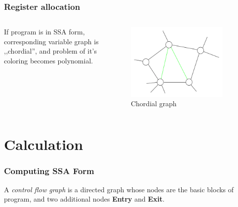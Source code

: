 \documentclass{beamer}
\begin{document}
  \begin{frame}
    \frametitle{Register allocation}
    \begin{columns}
       	\begin{column}{0.5\textwidth}
       		If program is in SSA form, corresponding variable graph is ,,chordial'', and problem of it's coloring becomes polynomial.
    	\end{column}
       	
    	\begin{column}{0.5\textwidth}
    	    \begin{figure}
			    \includegraphics[width=0.9\textwidth]{chordal-graph}
	    		\caption{Chordial graph}
    		\end{figure}
    	\end{column}
    \end{columns}
  \end{frame}  
  
  \section{Calculation}
  \begin{frame}
    \frametitle{Computing SSA Form}
    \begin{definition}
    	A \emph{control flow graph} is a directed graph whose nodes are the basic blocks of program, and two additional nodes \textbf{Entry} and \textbf{Exit}.
    \end{definition}
  \end{frame}
\end{document}
